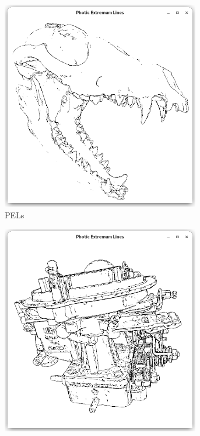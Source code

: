 \documentclass[9pt,fleqn,twoside,twocolumn]{stdglobal}
\begin{document}
\begin{figure}
\begin{subfigure}[t]{0.19\textwidth}
        \includegraphics[width=0.95\textwidth,trim={15px 15 15 50},clip]{images/results/skull-pel.png}
        \caption{PELs}
      \end{subfigure}%
      \hfill
      \begin{subfigure}[t]{0.19\textwidth}
        \centering
        \includegraphics[width=0.95\textwidth,trim={15px 15 15 50},clip]{images/results/carburetor-contours-pel.png}

\end{subfigure}
\end{figure}
\end{document}
